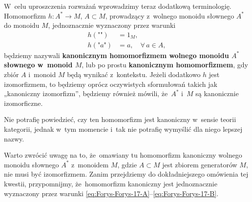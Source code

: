 \documentclass[a4paper,11pt]{article}
\begin{document}
 W~celu uproszczenia rozważań wprowadzimy teraz dodatkową
terminologię. Homomorfizm $h : A^{ * } \to M$, $A \subset M$, prowadzący
z~wolnego monoidu słownego $A^{ * }$ do monoidu $M$, jednoznacznie
wyznaczony przez warunki
\begin{subequations}
  \begin{align}
    \label{eq:Forys-Forys-17-A}
    h( \texttt{""} ) &= 1_{ M }, \\
    \label{eq:Forys-Forys-17-B}
    h( \texttt{"} a \texttt{"} ) &= a, \quad
                                   \forall \, a \in A,
  \end{align}
\end{subequations}
będziemy nazywali \textbf{kanonicznym homomorfizmem wolnego monoidu
  $A^{ * }$ słownego w~monoid $M$}, lub po prostu \textbf{kanonicznym
  homomorfizmem}, gdy zbiór $A$ i~monoid $M$ będą wynikać z~kontekstu.
Jeżeli dodatkowo $h$ jest izomorfizmem, to będziemy oprócz oczywistych
sformułowań takich jak „kanoniczny izomorfizm”, będziemy również
mówili, że~$A^{ * }$ i~$M$ są kanonicznie izomorficzne.

Nie potrafię powiedzieć, czy ten homomorfizm jest kanoniczny w~sensie
teorii kategorii, jednak w~tym momencie i~tak nie potrafię wymyślić
dla niego lepszej nazwy.

\vspace{\spaceFour}





 Warto zwrócić uwagę na to, że~omawiany tu homomorfizm
kanoniczny wolnego monoidu słownego $A^{ * }$ z~monoidem $M$, gdzie
$A \subset M$ jest zbiorem generatorów $M$, nie musi być izomorfizmem.
Zanim przejdziemy do dokładniejszego omówienia tej kwestii,
przypomnijmy, że~homomorfizm kanoniczny jest jednoznacznie wyznaczony
przez warunki \eqref{eq:Forys-Forys-17-A}--\eqref{eq:Forys-Forys-17-B}.
\end{document}
